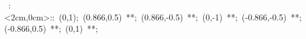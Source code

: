 \hbox{
\xy    <0cm,2cm>:<2cm,0cm>::
       (0,1); (0.866,0.5) **\dir{-};
       (0.866,-0.5) **\dir{-}; (0,-1) **\dir{-};
       (-0.866,-0.5) **\dir{-}; (-0.866,0.5) **\dir{-};
       (0,1) **\dir{-};
\endxy}
